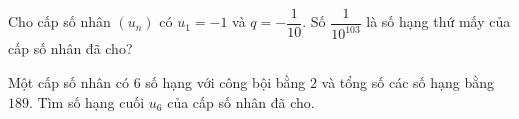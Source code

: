 \begin{ex}%
	Cho cấp số nhân $(u_n)$ có $u_1 = -1$ và $q = -\dfrac{1}{10}$. Số $\dfrac{1}{10^{103}}$ là số hạng  thứ mấy của cấp số nhân đã cho?
	 \loigiai{
		\[ 
		\dfrac{1}{10^{103}} = u_n = u_1 q^{n-1}  = -1 \cdot \left(-\dfrac{1}{10}\right)^{n-1} = \dfrac{(-1)^n}{10^{n-1}} \Rightarrow
		\heva{&n \text{ chẵn}\\&n-1 =  103} \Leftrightarrow n = 104.
		\] 
	 }
\end{ex}

\begin{ex}%
	Một cấp số nhân có $6$ số hạng với công bội bằng $2$ và tổng số các số hạng  bằng $189$. Tìm số hạng cuối $u_6$ của cấp số nhân đã cho.
\end{ex}

